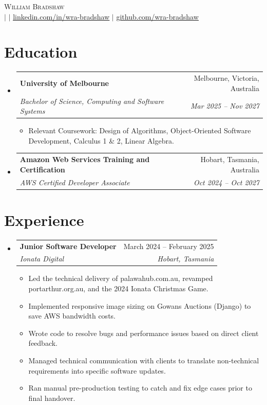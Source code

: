 \documentclass{article}
\makeatletter
\newcommand{\resumeItem}[1]{
  \item\small{
    {#1 \vspace{-2pt}}
  }
}
\newcommand{\resumeSubheading}[4]{
  \vspace{-2pt}\item
    \begin{tabular*}{0.97\textwidth}[t]{l@{\extracolsep{\fill}}r}
      \textbf{#1} & #2 \\
      \textit{\small#3} & \textit{\small #4} \\
    \end{tabular*}\vspace{-7pt}
}
\newcommand{\resumeSubHeadingListStart}{\begin{itemize}[leftmargin=0.15in, label={}]}
\newcommand{\resumeSubHeadingListEnd}{\end{itemize}}
\newcommand{\resumeItemListStart}{\begin{itemize}}
\newcommand{\resumeItemListEnd}{\end{itemize}\vspace{-5pt}}
\makeatother
\begin{document}
\begin{center}
    {\Large\scshape William Bradshaw}  \\ \vspace{1pt}
    \small {}  $|$ \href{mailto:\Secret{email}}{\underline{}}  $|$
    \href{https://linkedin.com/in/wra-bradshaw}{\underline{linkedin.com/in/wra-bradshaw}}  $|$
    \href{https://github.com/wra-bradshaw}{\underline{github.com/wra-bradshaw}}
\end{center}

\section{Education}
  \resumeSubHeadingListStart
    \resumeSubheading
      {University of Melbourne}{Melbourne, Victoria, Australia}
      {Bachelor of Science, Computing and Software Systems}{Mar 2025 -- Nov 2027}
      \resumeItemListStart
        \resumeItem{Relevant Coursework: Design of Algorithms, Object-Oriented Software Development, Calculus 1 \& 2, Linear Algebra.}
      \resumeItemListEnd

    \resumeSubheading
      {Amazon Web Services Training and Certification}{Hobart, Tasmania, Australia}
      {AWS Certified Developer Associate}{Oct 2024 -- Oct 2027}
  \resumeSubHeadingListEnd

\section{Experience}
  \resumeSubHeadingListStart
    \resumeSubheading
      {Junior Software Developer}{March 2024 -- February 2025}
      {Ionata Digital}{Hobart, Tasmania}
      \resumeItemListStart
        \resumeItem{Led the technical delivery of palawahub.com.au, revamped portarthur.org.au, and the 2024 Ionata Christmas Game.}
				\resumeItem{Implemented responsive image sizing on Gowans Auctions (Django) to save AWS bandwidth costs.}
        \resumeItem{Wrote code to resolve bugs and performance issues based on direct client feedback.}
        \resumeItem{Managed technical communication with clients to translate non-technical requirements into specific software updates.}
        \resumeItem{Ran manual pre-production testing to catch and fix edge cases prior to final handover.}
      \resumeItemListEnd
  \resumeSubHeadingListEnd

\end{document}
